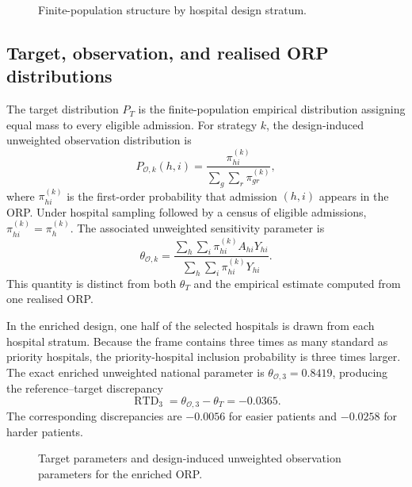 \begin{figure}[h!]
  \centering
  \caption{Finite-population structure by hospital design stratum.}
  \label{fig:nav-population-structure}
\end{figure}

\subsection{Target, observation, and realised ORP distributions}

The target distribution \(P_T\) is the finite-population empirical
distribution assigning equal mass to every eligible admission. For strategy
\(k\), the design-induced unweighted observation distribution is
\begin{equation}
  P_{\mathcal O,k}(h,i)
  =
  \frac{\pi_{hi}^{(k)}}
       {\sum_g\sum_r \pi_{gr}^{(k)}},
  \label{eq:nav-po}
\end{equation}
where \(\pi_{hi}^{(k)}\) is the first-order probability that admission
\((h,i)\) appears in the ORP. Under hospital sampling followed by a census of
eligible admissions, \(\pi_{hi}^{(k)}=\pi_h^{(k)}\). The associated
unweighted sensitivity parameter is
\begin{equation}
  \theta_{\mathcal O,k}
  =
  \frac{\sum_h\sum_i \pi_{hi}^{(k)}A_{hi}Y_{hi}}
       {\sum_h\sum_i \pi_{hi}^{(k)}Y_{hi}}.
  \label{eq:nav-theta-o}
\end{equation}
This quantity is distinct from both \(\theta_T\) and the empirical estimate
computed from one realised ORP.

In the enriched design, one half of the selected hospitals is drawn from each
hospital stratum. Because the frame contains three times as many standard as
priority hospitals, the priority-hospital inclusion probability is three times
larger. The exact enriched unweighted national parameter is
\(\theta_{\mathcal O,3}=0.8419\), producing the reference--target discrepancy
\begin{equation}
  \operatorname{RTD}_3
  =
  \theta_{\mathcal O,3}-\theta_T
  =-0.0365.
  \label{eq:nav-rtd}
\end{equation}
The corresponding discrepancies are \(-0.0056\) for easier patients and
\(-0.0258\) for harder patients.



\begin{figure}[h!]
  \centering
  \caption{Target parameters and design-induced unweighted observation parameters for the enriched ORP.}
  \label{fig:nav-target-observation}
\end{figure}

